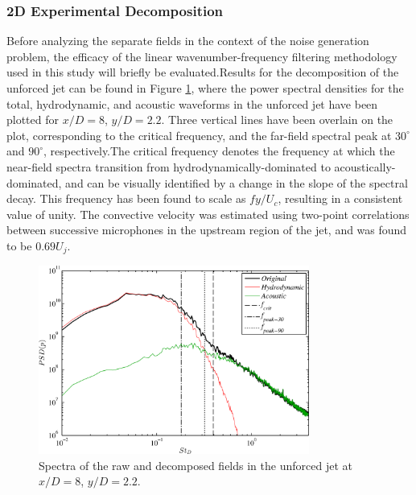 \documentclass[english]{aiaa-tc}
\begin{document}
\subsubsection{2D Experimental Decomposition}
Before analyzing the separate fields in the context of the noise generation problem, the efficacy of the linear wavenumber-frequency filtering methodology used in this study will briefly be evaluated.Results for the decomposition of the unforced jet can be found in Figure \ref{waveletdecomp}, where the power spectral densities for the total, hydrodynamic, and acoustic waveforms in the unforced jet have been plotted for $x/D = 8$, $y/D = 2.2$. Three vertical lines have been overlain on the plot, corresponding to the critical frequency, and the far-field spectral peak at $30^{\circ}$ and $90^{\circ}$, respectively.The critical frequency denotes the frequency at which the near-field spectra transition from hydrodynamically-dominated to acoustically-dominated, and can be visually identified by a change in the slope of the spectral decay. This frequency has been found to scale as $fy/U_{c}$, resulting in a consistent value of unity\cite{sinha2013}. The convective velocity was estimated using two-point correlations between successive microphones in the upstream region of the jet, and was found to be $0.69U_{j}$.
\begin{figure}
\begin{center}
	\includegraphics[width=3.5in]{waveletdecomposition2D}
    \caption{Spectra of the raw and decomposed fields in the unforced jet at $x/D=8$, $y/D=2.2$.}\label{waveletdecomp}
\end{center}
\end{figure}
\end{document}
